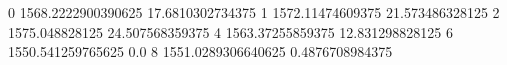 0 1568.2222900390625 17.6810302734375
1 1572.11474609375 21.573486328125
2 1575.048828125 24.507568359375
4 1563.37255859375 12.831298828125
6 1550.541259765625 0.0
8 1551.0289306640625 0.4876708984375
